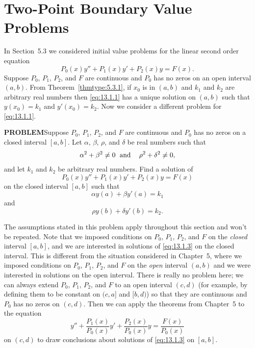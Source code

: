 \section{Two-Point Boundary Value Problems}

\noindent
In Section~5.3 we considered initial value problems for the linear second order equation
\begin{equation}
  \label{eq:13.1.1}P_{0}(x)y''+P_{1}(x)y'+P_{2}(x)y=F(x).
\end{equation}
Suppose $P_{0}$, $P_{1}$, $P_{2}$, and $F$ are continuous and $P_{0}$ has no zeros on an open
interval $(a,b)$. From Theorem~\ref{thmtype:5.3.1}, if $x_{0}$ is in $(a,b)$ and $k_{1}$ and $k_{2}$
are arbitrary real numbers then \eqref{eq:13.1.1} has a unique solution on $(a,b)$ such that
$y(x_{0})=k_{1}$ and $y'(x_{0})=k_{2}$. Now we consider a different problem for \eqref{eq:13.1.1}.

{\bf PROBLEM}\quad Suppose $P_{0}$, $P_{1}$, $P_{2}$, and $F$ are continuous and $P_{0}$ has no
zeros on a closed interval $[a,b]$. Let $\alpha$, $\beta$, $\rho$, and $\delta$ be real numbers such
that
\begin{equation}
  \label{eq:13.1.2}\alpha^{2}+\beta^{2}\ne0\text{\; and\; \; }\rho^{2}+\delta^{2}\ne0,
\end{equation}
and let $k_{1}$ and $k_{2}$ be arbitrary real numbers. Find a solution of
\begin{equation}
  \label{eq:13.1.3}P_{0}(x)y''+P_{1}(x)y'+P_{2}(x)y=F(x)
\end{equation}
on the closed interval $[a,b]$ such that
\begin{equation}
  \label{eq:13.1.4}\alpha y(a)+\beta y'(a)=k_{1}
\end{equation}
and
\begin{equation}
  \label{eq:13.1.5}\rho y(b)+\delta y'(b)=k_{2}.
\end{equation}

\medskip
The assumptions stated in this problem apply throughout this section and won't be repeated. Note
that we imposed conditions on $P_{0}$, $P_{1}$, $P_{2}$, and $F$ on the \emph{closed} interval
$[a,b]$, and we are interested in solutions of \eqref{eq:13.1.3} on the closed interval. This is
different from the situation considered in Chapter~5, where we imposed conditions on $P_{0}$,
$P_{1}$, $P_{2}$, and $F$ on the \emph{open} interval $(a,b)$ and we were interested in solutions on
the open interval. There is really no problem here; we can always extend $P_{0}$, $P_{1}$, $P_{2}$,
and $F$ to an open interval $(c,d)$ (for example, by defining them to be constant on $(c,a]$ and
$[b,d)$) so that they are continuous and $P_{0}$ has no zeros on $(c,d)$. Then we can apply the
theorems from Chapter~5 to the equation
\[
  y''+\frac{P_{1}(x)}{P_{0}(x)}y'+ \frac{P_{2}(x)}{P_{0}(x)}y=\frac{F(x)}{P_{0}(x)}
\]
on $(c,d)$ to draw conclusions about solutions of \eqref{eq:13.1.3} on $[a,b]$.


